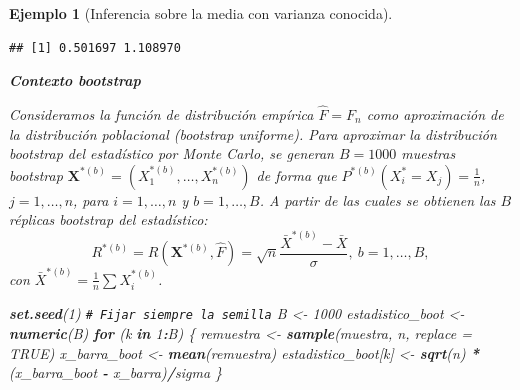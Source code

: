 \documentclass[
]{book}
\newenvironment{Shaded}{\begin{snugshade}}{\end{snugshade}}
\newcommand{\AttributeTok}[1]{\textcolor[rgb]{0.13,0.29,0.53}{#1}}
\newcommand{\CommentTok}[1]{\textcolor[rgb]{0.56,0.35,0.01}{\textit{#1}}}
\newcommand{\ConstantTok}[1]{\textcolor[rgb]{0.56,0.35,0.01}{#1}}
\newcommand{\ControlFlowTok}[1]{\textcolor[rgb]{0.13,0.29,0.53}{\textbf{#1}}}
\newcommand{\DecValTok}[1]{\textcolor[rgb]{0.00,0.00,0.81}{#1}}
\newcommand{\FunctionTok}[1]{\textcolor[rgb]{0.13,0.29,0.53}{\textbf{#1}}}
\newcommand{\NormalTok}[1]{#1}
\newcommand{\OtherTok}[1]{\textcolor[rgb]{0.56,0.35,0.01}{#1}}
\newcommand{\SpecialCharTok}[1]{\textcolor[rgb]{0.81,0.36,0.00}{\textbf{#1}}}
\renewcommand{\mathbf}[1]{\symbf{#1}}
\theoremstyle{break}
\newtheorem{example}{Ejemplo}[chapter]
\theoremstyle{nonumberplain}
\renewcommand{\CommentTok}[1]{\textcolor[rgb]{0.41,0.41,0.41}{\texttt{#1}}}
\begin{document}
\begin{example}[Inferencia sobre la media con varianza conocida]
\begin{verbatim}
## [1] 0.501697 1.108970
\end{verbatim}

\textbf{\emph{Contexto bootstrap}}

Consideramos la función de distribución empírica \(\hat{F}=F_n\)
como aproximación de la distribución poblacional (bootstrap uniforme).
Para aproximar la distribución bootstrap del estadístico por Monte Carlo,
se generan \(B=1000\) muestras bootstrap
\(\mathbf{X}^{\ast (b)}=\left( X_1^{\ast (b)},\ldots ,X_n^{\ast (b)} \right)\)
de forma que
\(P^{\ast (b)}\left( X_i^{\ast}=X_j \right) =
\frac{1}{n}\), \(j=1,\ldots ,n\), para \(i=1,\ldots, n\) y \(b=1,\ldots, B\).
A partir de las cuales se obtienen las \(B\) réplicas bootstrap del estadístico:
\[R^{\ast (b)}=R\left( \mathbf{X}^{\ast (b)},\hat{F} \right) =\sqrt{n}\frac{
\bar{X}^{\ast  (b)}-\bar{X}}{\sigma }, \ b=1,\ldots, B, \]
con \(\bar{X}^{\ast (b)} = \frac{1}{n}\sum X_i^{\ast (b)}\).

\begin{Shaded}
\begin{Highlighting}[]
\FunctionTok{set.seed}\NormalTok{(}\DecValTok{1}\NormalTok{) }\CommentTok{\# Fijar siempre la semilla}
\NormalTok{B }\OtherTok{\textless{}{-}} \DecValTok{1000}
\NormalTok{estadistico\_boot }\OtherTok{\textless{}{-}} \FunctionTok{numeric}\NormalTok{(B)}
\ControlFlowTok{for}\NormalTok{ (k }\ControlFlowTok{in} \DecValTok{1}\SpecialCharTok{:}\NormalTok{B) \{}
\NormalTok{    remuestra }\OtherTok{\textless{}{-}} \FunctionTok{sample}\NormalTok{(muestra, n, }\AttributeTok{replace =} \ConstantTok{TRUE}\NormalTok{)}
\NormalTok{    x\_barra\_boot }\OtherTok{\textless{}{-}} \FunctionTok{mean}\NormalTok{(remuestra)}
\NormalTok{    estadistico\_boot[k] }\OtherTok{\textless{}{-}} \FunctionTok{sqrt}\NormalTok{(n) }\SpecialCharTok{*}\NormalTok{ (x\_barra\_boot }\SpecialCharTok{{-}}\NormalTok{ x\_barra)}\SpecialCharTok{/}\NormalTok{sigma}
\NormalTok{\}}
\end{Highlighting}
\end{Shaded}


\end{example}
\end{document}
